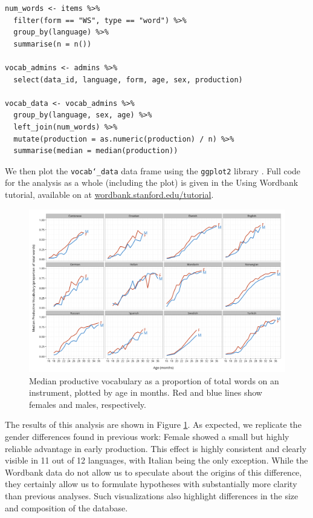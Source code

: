 \documentclass[man,noapacite]{apa}
\begin{document}
\begin{lstlisting}
num_words <- items %>%
  filter(form == "WS", type == "word") %>%
  group_by(language) %>%
  summarise(n = n())

vocab_admins <- admins %>%
  select(data_id, language, form, age, sex, production)

vocab_data <- vocab_admins %>%
  group_by(language, sex, age) %>%
  left_join(num_words) %>%
  mutate(production = as.numeric(production) / n) %>%
  summarise(median = median(production))
\end{lstlisting}

\noindent We then plot the \texttt{vocab\char`_data} data frame using the \texttt{ggplot2} library \cite{wickham2009}. Full code for the analysis as a whole (including the plot) is given in the Using Wordbank tutorial, available on at \url{wordbank.stanford.edu/tutorial}.

\begin{figure}[ht!]
\includegraphics[width=6in]{figures/gender.png}
\caption{\label{fig:gender} Median productive vocabulary as a proportion of total words on an instrument, plotted by age in months. Red and blue lines show females and males, respectively.}
\end{figure}

The results of this analysis are shown in Figure \ref{fig:gender}. As expected, we replicate the gender differences found in previous work: Female showed a small but highly reliable advantage in early production. This effect is highly consistent and clearly visible in 11 out of 12 languages, with Italian being the only exception. While the Wordbank data do not allow us to speculate about the origins of this difference, they certainly allow us to formulate hypotheses with substantially more clarity than previous analyses. Such visualizations also highlight differences in the size and composition of the database.
\end{document}
